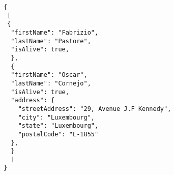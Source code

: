 
\begin{minipage}{14cm}
\footnotesize
\begin{lstlisting}[caption=JSON file generated by deleting a subtree from Listing~\ref{JSONfile}., label=mutatedJSONfile]
{
 [
 {
  "firstName": "Fabrizio",
  "lastName": "Pastore",
  "isAlive": true,
  },
  {
  "firstName": "Oscar",
  "lastName": "Cornejo",
  "isAlive": true,
  "address": {
    "streetAddress": "29, Avenue J.F Kennedy",
    "city": "Luxembourg",
    "state": "Luxembourg",
    "postalCode": "L-1855"
  },
  }
  ]
}
\end{lstlisting}
\end{minipage}